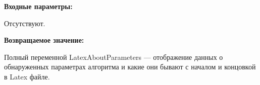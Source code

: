 \textbf{Входные параметры:}

Отсутствуют.

\textbf{Возвращаемое значение:}

Полный переменной LatexAboutParameters --- отображение данных о обнаруженных параметрах алгоритма и какие они бывают с началом и концовкой в Latex файле.